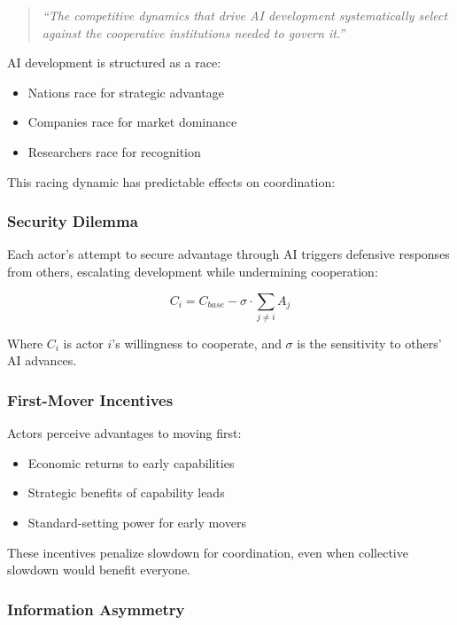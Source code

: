 \documentclass[11pt,letterpaper]{article}
\begin{document}
\begin{quote}
\textit{``The competitive dynamics that drive AI development systematically select against the cooperative institutions needed to govern it.''}
\end{quote}

AI development is structured as a race:
\begin{itemize}
\item Nations race for strategic advantage
\item Companies race for market dominance
\item Researchers race for recognition
\end{itemize}

This racing dynamic has predictable effects on coordination:

\subsubsection{Security Dilemma}

Each actor's attempt to secure advantage through AI triggers defensive responses from others, escalating development while undermining cooperation:

\begin{equation}
C_i = C_{base} - \sigma \cdot \sum_{j \neq i} A_j
\label{eq:security}
\end{equation}

Where $C_i$ is actor $i$'s willingness to cooperate, and $\sigma$ is the sensitivity to others' AI advances.

\subsubsection{First-Mover Incentives}

Actors perceive advantages to moving first:
\begin{itemize}
\item Economic returns to early capabilities
\item Strategic benefits of capability leads
\item Standard-setting power for early movers
\end{itemize}

These incentives penalize slowdown for coordination, even when collective slowdown would benefit everyone.

\subsubsection{Information Asymmetry}
\end{document}
